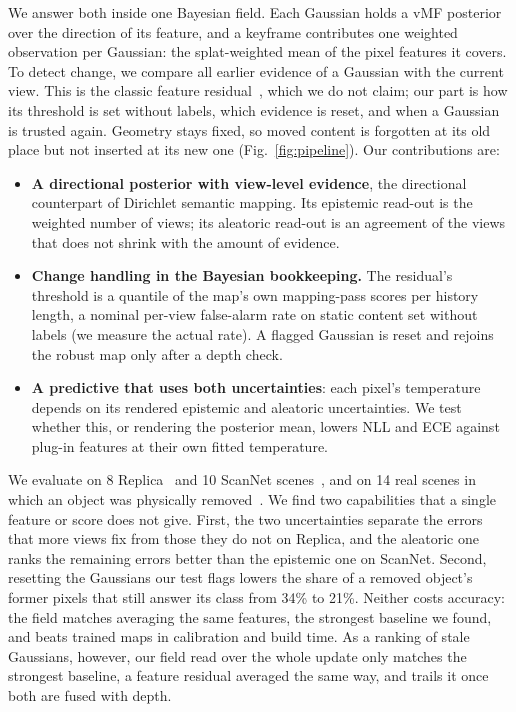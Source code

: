 \documentclass[journal]{IEEEtran}
\begin{document}
We answer both inside one Bayesian field. Each Gaussian holds a vMF posterior~\cite{mardia2000directional} over the direction of its feature, and a keyframe contributes one weighted observation per Gaussian: the splat-weighted mean of the pixel features it covers. To detect change, we compare all earlier evidence of a Gaussian with the current view. This is the classic feature residual~\cite{ackermann2025clsplats, jiang2026mif}, which we do not claim; our part is how its threshold is set without labels, which evidence is reset, and when a Gaussian is trusted again. Geometry stays fixed, so moved content is forgotten at its old place but not inserted at its new one (Fig.~\ref{fig:pipeline}). Our contributions are:
\begin{itemize}
\item \textbf{A directional posterior with view-level evidence}, the directional counterpart of Dirichlet semantic mapping. Its epistemic read-out is the weighted number of views; its aleatoric read-out is an agreement of the views that does not shrink with the amount of evidence.
\item \textbf{Change handling in the Bayesian bookkeeping.} The residual's threshold is a quantile of the map's own mapping-pass scores per history length, a nominal per-view false-alarm rate on static content set without labels (we measure the actual rate). A flagged Gaussian is reset and rejoins the robust map only after a depth check.
\item \textbf{A predictive that uses both uncertainties}: each pixel's temperature depends on its rendered epistemic and aleatoric uncertainties. We test whether this, or rendering the posterior mean, lowers NLL and ECE against plug-in features at their own fitted temperature.
\end{itemize}

We evaluate on 8 Replica~\cite{straub2019replica, zhi2021semanticnerf} and 10 ScanNet scenes~\cite{dai2017scannet}, and on 14 real scenes in which an object was physically removed~\cite{weder2023removing}. We find two capabilities that a single feature or score does not give. First, the two uncertainties separate the errors that more views fix from those they do not on Replica, and the aleatoric one ranks the remaining errors better than the epistemic one on ScanNet. Second, resetting the Gaussians our test flags lowers the share of a removed object's former pixels that still answer its class from 34\% to 21\%. Neither costs accuracy: the field matches averaging the same features, the strongest baseline we found, and beats trained maps in calibration and build time. As a ranking of stale Gaussians, however, our field read over the whole update only matches the strongest baseline, a feature residual averaged the same way, and trails it once both are fused with depth.
\end{document}
